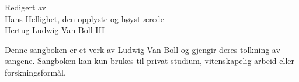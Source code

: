 \documentclass[11pt,a5paper,wordbk,norsk]{../SSSongbook}
\begin{document}
\let\cleardoublepage\clearpage %

{Redigert av\\
  Hans Hellighet, den opplyste og høyst ærede\\
Hertug Ludwig Van Boll III}

\ifChordBk
\let\cleardoublepage\clearpage %
\fancyhead[R,L]{}
\tableofcontents %
\vfil
Denne sangboken er et verk av Ludwig Van Boll
og gjengir deres tolkning av sangene.
Sangboken kan kun brukes til privat studium, vitenskapelig arbeid
eller forskningsformål.\par
\pagebreak
\fi




















\ifChordBk
\printindex
\fi
\end{document}
